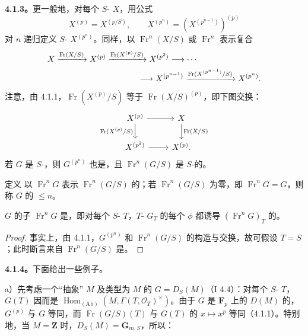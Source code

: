 \textbf{4.1.3。}更一般地，对每个 $S$- $X$，用公式
\[
X^{(p)}=X^{(p/S)},\qquad X^{(p^n)}=(X^{(p^{n-1})})^{(p)}
\]
对 $n$ 递归定义 $S$- $X^{(p^n)}$。同样，以 $\operatorname{Fr}^n(X/S)$ 或 $\operatorname{Fr}^n$ 表示复合
\[
\begin{aligned}
X&\xrightarrow{\operatorname{Fr}(X/S)}X^{(p)}\xrightarrow{\operatorname{Fr}(X^{(p)}/S)}X^{(p^2)}\longrightarrow\cdots\\
&\hspace{35mm}\longrightarrow X^{(p^{n-1})}\xrightarrow{\operatorname{Fr}(X^{(p^{n-1})}/S)}X^{(p^n)}.
\end{aligned}
\]
注意，由 4.1.1，$\operatorname{Fr}(X^{(p)}/S)$ 等于 $\operatorname{Fr}(X/S)^{(p)}$，即下图交换：
\[
\begin{tikzcd}
X^{(p)}\arrow[r]\arrow[d,"\operatorname{Fr}(X^{(p)}/S)"']&X\arrow[d,"\operatorname{Fr}(X/S)"]\\
X^{(p^2)}\arrow[r]&X^{(p)}.
\end{tikzcd}
\]
若 $G$ 是 $S$-，则 $G^{(p^n)}$ 也是，且 $\operatorname{Fr}^n(G/S)$ 是 $S$-的。
\begin{SGAresult}{定义}{}
以 $\operatorname{Fr}^nG$ 表示 $\operatorname{Fr}^n(G/S)$ 的；若 $\operatorname{Fr}^n(G/S)$ 为零，即 $\operatorname{Fr}^nG=G$，则称 $G$ 的 $\leq n$。
\end{SGAresult}
\begin{SGAresult}{}{}
$G$ 的子 $\operatorname{Fr}^nG$ 是，即对每个 $S$- $T$，$T$- $G_T$ 的每个 $\phi$ 都诱导 $(\operatorname{Fr}^nG)_T$ 的。
\end{SGAresult}
\begin{proof}
事实上，由 4.1.1，$G^{(p^n)}$ 和 $\operatorname{Fr}^n(G/S)$ 的构造与交换，故可假设 $T=S$；此时断言来自 $\operatorname{Fr}^n(G/S)$ 是。
\end{proof}
\textbf{4.1.4。}下面给出一些例子。

 a）先考虑一个“抽象” $M$ 及类型为 $M$ 的 $G=D_S(M)$（I 4.4）：对每个 $S$- $T$，$G(T)$ 因而是 $\operatorname{Hom}_{(\mathrm{Ab})}(M,\Gamma(T,\mathcal O_T)^\times)$。由于 $G$ 是 $\mathbf F_p$ 上的 $D(M)$ 的，$G^{(p)}$ 与 $G$ 等同，而 $\operatorname{Fr}(G/S)(T)$ 与 $G(T)$ 的 $x\mapsto x^p$ 等同（4.1.1）。特别地，当 $M=\mathbf Z$ 时，$D_S(M)=\mathbf G_{m,S}$，所以：

